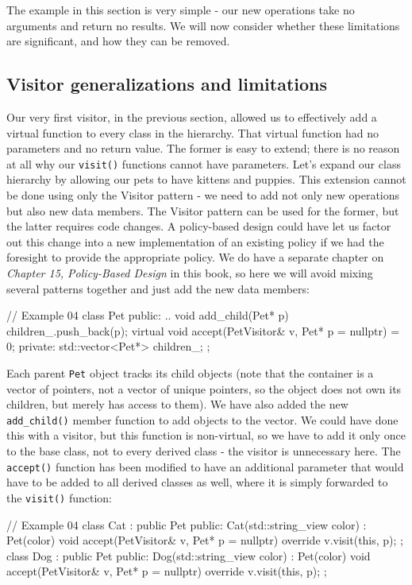 The example in this section is very simple - our new operations take no arguments and return no results. We will now consider whether these limitations are significant, and how they can be removed.

\subsection{Visitor generalizations and limitations}

Our very first visitor, in the previous section, allowed us to effectively add a virtual function to every class in the hierarchy. That virtual function had no parameters and no return value. The former is easy to extend; there is no reason at all why our \texttt{visit()} functions cannot have parameters. Let's expand our class hierarchy by allowing our pets to have kittens and puppies. This extension cannot be done using only the Visitor pattern - we need to add not only new operations but also new data members. The Visitor pattern can be used for the former, but the latter requires code changes. A policy-based design could have let us factor out this change into a new implementation of an existing policy if we had the foresight to provide the appropriate policy. We do have a separate chapter on \emph{Chapter 15, Policy-Based Design} in this book, so here we will avoid mixing several patterns together and just add the new data members:

\begin{code}
// Example 04
class Pet {
  public:
  ..
  void add_child(Pet* p) { children_.push_back(p); }
  virtual void accept(PetVisitor& v, Pet* p = nullptr) = 0;
  private:
  std::vector<Pet*> children_;
};
\end{code}

Each parent \texttt{Pet} object tracks its child objects (note that the container is a vector of pointers, not a vector of unique pointers, so the object does not own its children, but merely has access to them). We have also added the new \texttt{add\_child()} member function to add objects to the vector. We could have done this with a visitor, but this function is non-virtual, so we have to add it only once to the base class, not to every derived class - the visitor is unnecessary here. The \texttt{accept()} function has been modified to have an additional parameter that would have to be added to all derived classes as well, where it is simply forwarded to the \texttt{visit()} function:

\begin{code}
// Example 04
class Cat : public Pet {
  public:
  Cat(std::string_view color) : Pet(color) {}
  void accept(PetVisitor& v, Pet* p = nullptr) override {
    v.visit(this, p);
  }
};
class Dog : public Pet {
  public:
  Dog(std::string_view color) : Pet(color) {}
  void accept(PetVisitor& v, Pet* p = nullptr) override {
    v.visit(this, p);
  }
};
\end{code}

